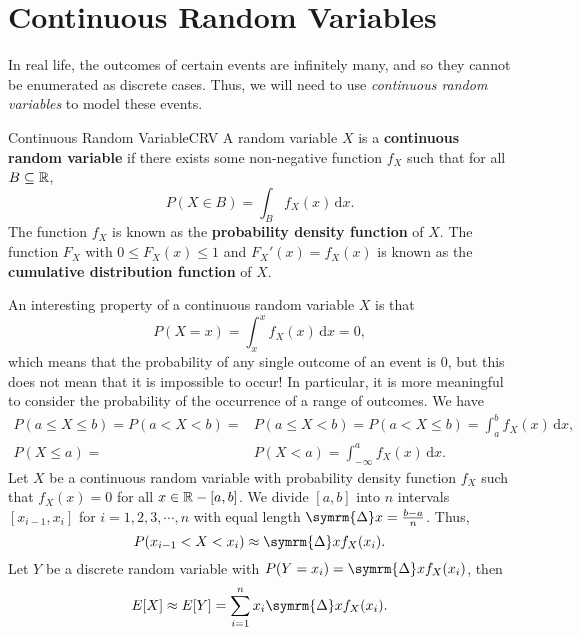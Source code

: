\documentclass[math]{amznotes}
\theoremstyle{remark}
\begin{document}
\section{Continuous Random Variables}
In real life, the outcomes of certain events are infinitely many, and so they cannot be enumerated as discrete cases. Thus, we will need to use \textit{continuous random variables} to model these events.
\begin{dfnbox}{Continuous Random Variable}{CRV}
    A random variable $X$ is a {\color{red} \textbf{continuous random variable}} if there exists some non-negative function $f_X$ such that for all $B \subseteq \mathbb{R}$,
    \begin{equation*}
        P(X \in B) = \int_B\!f_X(x)\,\mathrm{d}x.
    \end{equation*}
    The function $f_X$ is known as the {\color{red} \textbf{probability density function}} of $X$. The function $F_X$ with $0 \leq F_X(x) \leq 1$ and $F_X'(x) = f_X(x)$ is known as the {\color{red} \textbf{cumulative distribution function}} of $X$.
\end{dfnbox}
An interesting property of a continuous random variable $X$ is that
\begin{equation*}
    P(X = x) = \int_{x}^{x}\!f_X(x) \,\mathrm{d}x = 0,
\end{equation*}
which means that the probability of any single outcome of an event is $0$, but this does not mean that it is impossible to occur! In particular, it is more meaningful to consider the probability of the occurrence of a range of outcomes. We have
\begin{align*}
    P(a \leq X \leq b) = P(a < X < b) = & P(a \leq X < b) = P(a < X \leq b) = \int_{a}^{b}\!f_X(x) \,\mathrm{d}x, \\
    P(X \leq a) = & P(X < a) = \int_{-\infty}^{a}\!f_X(x) \,\mathrm{d}x.
\end{align*}
Let $X$ be a continuous random variable with probability density function $f_X$ such that $f_X(x) = 0$ for all $x \in \mathbb{R} - [a, b]$. We divide $[a, b]$ into $n$ intervals $[x_{i - 1}, x_i]$ for $i = 1, 2, 3, \cdots, n$ with equal length $\symrm{\Delta} x = \frac{b - a}{n}$. Thus,
\begin{equation*}
    P(x_{i - 1} < X < x_i) \approx \symrm{\Delta}xf_X(x_i).
\end{equation*}
Let $Y$ be a discrete random variable with $P(Y = x_i) = \symrm{\Delta}xf_X(x_i)$, then 
\begin{equation*}
    E[X] \approx E[Y] = \sum_{i = 1}^{n}x_i\symrm{\Delta}xf_X(x_i).
\end{equation*}
\end{document}
